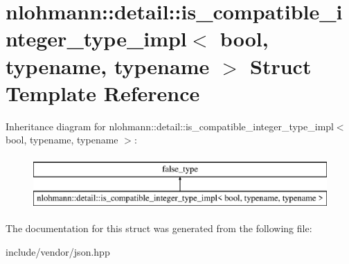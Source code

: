 \hypertarget{structnlohmann_1_1detail_1_1is__compatible__integer__type__impl}{}\section{nlohmann\+:\+:detail\+:\+:is\+\_\+compatible\+\_\+integer\+\_\+type\+\_\+impl$<$ bool, typename, typename $>$ Struct Template Reference}
\label{structnlohmann_1_1detail_1_1is__compatible__integer__type__impl}
Inheritance diagram for nlohmann\+:\+:detail\+:\+:is\+\_\+compatible\+\_\+integer\+\_\+type\+\_\+impl$<$ bool, typename, typename $>$\+:\begin{figure}[H]
\begin{center}
\leavevmode
\includegraphics[height=2.000000cm]{dd/d13/structnlohmann_1_1detail_1_1is__compatible__integer__type__impl}
\end{center}
\end{figure}


The documentation for this struct was generated from the following file\+:\begin{DoxyCompactItemize}
\item 
include/vendor/json.\+hpp\end{DoxyCompactItemize}

